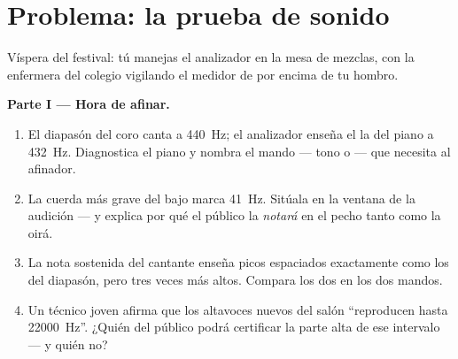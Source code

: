 \section{Problema: la prueba de sonido}

\begin{problem}\label{pb:g8:sound-pitch-loudness:1}
Víspera del festival: tú manejas el analizador en la mesa de mezclas,
con la enfermera del colegio vigilando el medidor de  por
encima de tu hombro.

\medskip\noindent\textbf{Parte I --- Hora de afinar.}
\begin{enumerate}
  \item El diapasón del coro canta a \qty{440}{Hz}; el analizador
        enseña el la del piano a \qty{432}{Hz}. Diagnostica el piano
        y nombra el mando --- tono o  --- que necesita al
        afinador.
  \item La cuerda más grave del bajo marca \qty{41}{Hz}. Sitúala en
        la ventana de la audición --- y explica por qué el
        público la \emph{notará} en el pecho tanto como la oirá.
  \item La nota sostenida del cantante enseña picos espaciados
        exactamente como los del diapasón, pero tres veces más
        altos. Compara los dos  en los dos mandos.
  \item Un técnico joven afirma que los altavoces nuevos del salón
        ``reproducen hasta \qty{22000}{Hz}''. ¿Quién del público
        podrá certificar la parte alta de ese intervalo --- y quién
        no?
\end{enumerate}


\end{problem}
